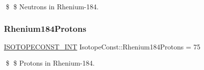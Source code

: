 \$ \$ Neutrons in Rhenium-\/184. \mbox{\label{group___isotope_const-_rhenium-_re184_ga873e3cf8555e69662597c227d235983d}} 
\subsubsection{\texorpdfstring{Rhenium184\+Protons}{Rhenium184Protons}}
{\footnotesize\ttfamily \mbox{\hyperlink{group___isotope_const-_macros_ga5f18360b3e99483a35c32d789e62621c}{I\+S\+O\+T\+O\+P\+E\+C\+O\+N\+S\+T\+\_\+\+I\+NT}} Isotope\+Const\+::\+Rhenium184\+Protons = 75}

\$ \$ Protons in Rhenium-\/184. 